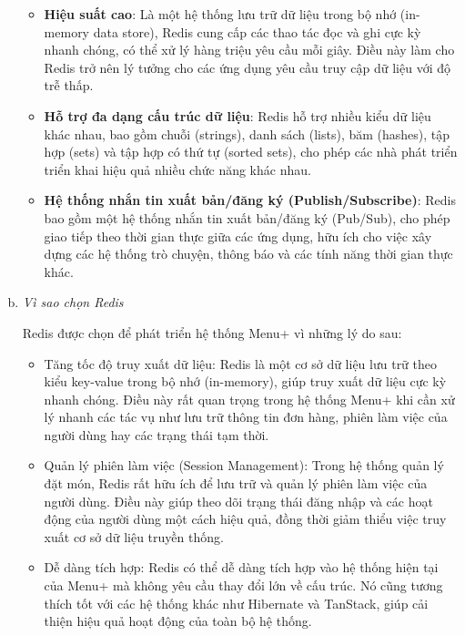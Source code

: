 \begin{enumerate}[(a)]
	      \begin{itemize}
		      \item \textbf{Hiệu suất cao}: Là một hệ thống lưu trữ dữ liệu trong bộ nhớ (in-memory data store), Redis cung cấp các thao tác đọc và ghi cực kỳ nhanh chóng, có thể xử lý hàng triệu yêu cầu mỗi giây. Điều này làm cho Redis trở nên lý tưởng cho các ứng dụng yêu cầu truy cập dữ liệu với độ trễ thấp.
		      \item \textbf{Hỗ trợ đa dạng cấu trúc dữ liệu}: Redis hỗ trợ nhiều kiểu dữ liệu khác nhau, bao gồm chuỗi (strings), danh sách (lists), băm (hashes), tập hợp (sets) và tập hợp có thứ tự (sorted sets), cho phép các nhà phát triển triển khai hiệu quả nhiều chức năng khác nhau.
		      \item \textbf{Hệ thống nhắn tin xuất bản/đăng ký (Publish/Subscribe)}: Redis bao gồm một hệ thống nhắn tin xuất bản/đăng ký (Pub/Sub), cho phép giao tiếp theo thời gian thực giữa các ứng dụng, hữu ích cho việc xây dựng các hệ thống trò chuyện, thông báo và các tính năng thời gian thực khác.
	      \end{itemize}

	\item \textit{Vì sao chọn Redis}

	      Redis được chọn để phát triển hệ thống Menu+ vì những lý do sau:

	      \begin{itemize}
		      \item Tăng tốc độ truy xuất dữ liệu: Redis là một cơ sở dữ liệu lưu trữ theo kiểu key-value trong bộ nhớ (in-memory), giúp truy xuất dữ liệu cực kỳ nhanh chóng. Điều này rất quan trọng trong hệ thống Menu+ khi cần xử lý nhanh các tác vụ như lưu trữ thông tin đơn hàng, phiên làm việc của người dùng hay các trạng thái tạm thời.
		      \item Quản lý phiên làm việc (Session Management): Trong hệ thống quản lý đặt món, Redis rất hữu ích để lưu trữ và quản lý phiên làm việc của người dùng. Điều này giúp theo dõi trạng thái đăng nhập và các hoạt động của người dùng một cách hiệu quả, đồng thời giảm thiểu việc truy xuất cơ sở dữ liệu truyền thống.
		      \item Dễ dàng tích hợp: Redis có thể dễ dàng tích hợp vào hệ thống hiện tại của Menu+ mà không yêu cầu thay đổi lớn về cấu trúc. Nó cũng tương thích tốt với các hệ thống khác như Hibernate và TanStack, giúp cải thiện hiệu quả hoạt động của toàn bộ hệ thống.
	      \end{itemize}


\end{enumerate}
